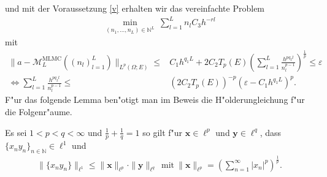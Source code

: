und mit der Voraussetzung \ref{v} erhalten wir das vereinfachte Problem
\begin{align}
\min_{(n_1,...,n_L)\in\mathbb{N}^L} \ \sum_{l=1}^L n_lC_3h^{-rl}
\end{align}
mit
\begin{align}
\|a-\mathcal{M}_L^{\text{MLMC}}((n_l)_{l=1}^L)\|_{L^p(\Omega;E)}\leq &C_1 h^{q_1L}+2C_2 T_p(E)\left(\sum_{l=1}^L \frac{h^{p q_2 l}}{n_l^{p-1}}\right)^{\frac{1}{p}}\leq\varepsilon\\
\Leftrightarrow
\sum_{l=1}^L \frac{h^{pq_2l}}{n_l^{p-1}}\leq& (2C_2T_p(E))^{-p}(\varepsilon-C_1h^{q_1L})^p.
\end{align}
F"ur das folgende Lemma ben"otigt man im Beweis die H"olderungleichung f"ur die Folgenr"aume. 
\begin{sz}[H"olderungleichung]
Es sei $1<p<q<\infty$ und $\frac{1}{p}+\frac{1}{q}=1$ so gilt f"ur $\textbf{x}\in \ell^p$ und $\textbf{y}\in \ell^q$, dass $\{x_ny_n\}_{n\in\mathbb{N}}\in\ell^1$ und
\begin{align*}
\|\{x_ny_n\}\|_{\ell^1}\leq\|\textbf{x}\|_{\ell^p}\cdot\|\textbf{y}\|_{\ell^q} \ \ \text{mit} \ \|\textbf{x}\|_{\ell^p}=\left(\sum_{n=1}^\infty |x_n|^p\right)^{\frac{1}{p}}.
\end{align*}
\end{sz}
